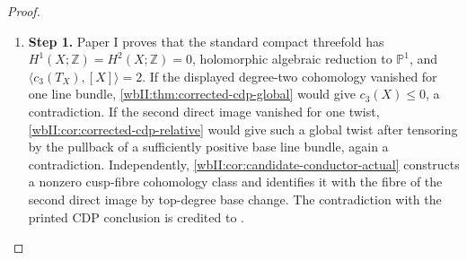 \begin{proof}
\begin{enumerate}[label={$\langle1\rangle$\arabic*.},leftmargin=*]
\item 
\noindent\textbf{Step 1.} Paper I proves that the standard compact threefold has
$H^1(X;\mathbb Z)=H^2(X;\mathbb Z)=0$, holomorphic algebraic reduction
to $\mathbb P^1$, and $\langle c_3(T_X),[X]\rangle=2$.
If the displayed degree-two cohomology vanished for one line bundle,
\cref{wbII:thm:corrected-cdp-global} would give $c_3(X)\le0$, a contradiction.
If the second direct image vanished for one twist,
\cref{wbII:cor:corrected-cdp-relative} would give such a global twist after
tensoring by the pullback of a sufficiently positive base line bundle,
again a contradiction. Independently,
\cref{wbII:cor:candidate-conductor-actual} constructs a nonzero cusp-fibre
cohomology class and identifies it with the fibre of the second direct
image by top-degree base change. The contradiction with the printed
CDP conclusion is credited to \citet[Section~10.2, Theorem~10.5]{AC2026}.

\end{enumerate}
\end{proof}

